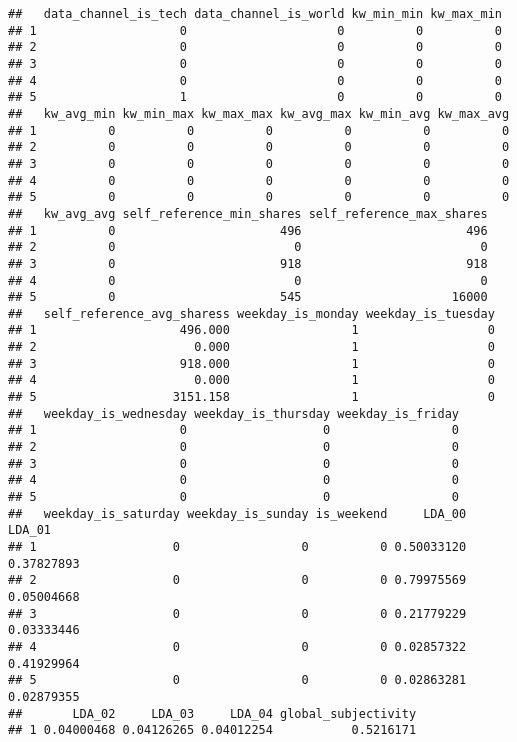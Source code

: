 \documentclass[]{article}
\begin{document}
\begin{verbatim}
##   data_channel_is_tech data_channel_is_world kw_min_min kw_max_min
## 1                    0                     0          0          0
## 2                    0                     0          0          0
## 3                    0                     0          0          0
## 4                    0                     0          0          0
## 5                    1                     0          0          0
##   kw_avg_min kw_min_max kw_max_max kw_avg_max kw_min_avg kw_max_avg
## 1          0          0          0          0          0          0
## 2          0          0          0          0          0          0
## 3          0          0          0          0          0          0
## 4          0          0          0          0          0          0
## 5          0          0          0          0          0          0
##   kw_avg_avg self_reference_min_shares self_reference_max_shares
## 1          0                       496                       496
## 2          0                         0                         0
## 3          0                       918                       918
## 4          0                         0                         0
## 5          0                       545                     16000
##   self_reference_avg_sharess weekday_is_monday weekday_is_tuesday
## 1                    496.000                 1                  0
## 2                      0.000                 1                  0
## 3                    918.000                 1                  0
## 4                      0.000                 1                  0
## 5                   3151.158                 1                  0
##   weekday_is_wednesday weekday_is_thursday weekday_is_friday
## 1                    0                   0                 0
## 2                    0                   0                 0
## 3                    0                   0                 0
## 4                    0                   0                 0
## 5                    0                   0                 0
##   weekday_is_saturday weekday_is_sunday is_weekend     LDA_00     LDA_01
## 1                   0                 0          0 0.50033120 0.37827893
## 2                   0                 0          0 0.79975569 0.05004668
## 3                   0                 0          0 0.21779229 0.03333446
## 4                   0                 0          0 0.02857322 0.41929964
## 5                   0                 0          0 0.02863281 0.02879355
##       LDA_02     LDA_03     LDA_04 global_subjectivity
## 1 0.04000468 0.04126265 0.04012254           0.5216171

\end{verbatim}
\end{document}
